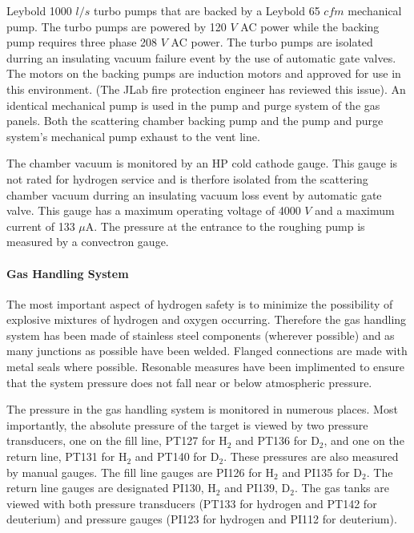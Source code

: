 \begin{safetyen}{0}{0}
{\begin{description}
Leybold 1000 $l/s$ turbo pumps that are backed by a Leybold 65 $cfm$
mechanical pump. The turbo pumps are powered by 120 $V$ AC power
while the backing pump requires three phase 208 $V$ AC power. The
turbo pumps are isolated durring an insulating vacuum failure event
by the use of automatic gate valves. The motors on the backing pumps
are induction motors and approved for use in this environment. (The
JLab fire protection engineer has reviewed this issue). An identical
mechanical pump is used in the pump and purge system of the gas panels.
Both the scattering chamber backing pump and the pump and purge system's
mechanical pump exhaust to the vent line.
\item [{\bf Vacuum Gauges}] The chamber vacuum is monitored by an HP cold
cathode gauge. This gauge is not rated for hydrogen service and is
therfore isolated from the scattering chamber vacuum durring an insulating
vacuum loss event by automatic gate valve. This gauge has a maximum
operating voltage of 4000 $V$ and a maximum current of 133 $\mu$A.
The pressure at the entrance to the roughing pump is measured by a
convectron gauge. 
\end{description}
}

\paragraph{Gas Handling System}

The most important aspect of hydrogen safety is to minimize the possibility
of explosive mixtures of hydrogen and oxygen occurring. Therefore
the gas handling system has been made of stainless steel components
(wherever possible) and as many junctions as possible have been welded.
Flanged connections are made with metal seals where possible. Resonable
measures have been implimented to ensure that the system pressure
does not fall near or below atmospheric pressure.

The pressure in the gas handling system is monitored in numerous places.
Most importantly, the absolute pressure of the target is viewed by
two pressure transducers, one on the fill line, PT127 for H$_{2}$
and PT136 for D$_{2}$, and one on the return line, PT131 for H$_{2}$
and PT140 for D$_{2}$. These pressures are also measured by manual
gauges. The fill line gauges are PI126 for H$_{2}$ and PI135 for
D$_{2}$. The return line gauges are designated PI130, H$_{2}$ and
PI139, D$_{2}$. The gas tanks are viewed with both pressure transducers
(PT133 for hydrogen and PT142 for deuterium) and pressure gauges (PI123
for hydrogen and PI112 for deuterium).


\end{safetyen}
